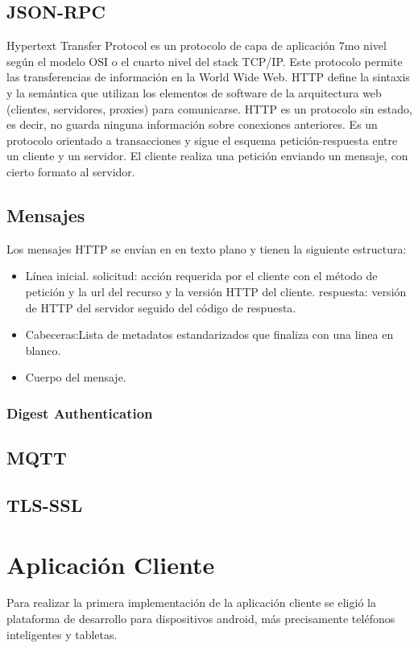 \subsection{JSON-RPC}
Hypertext Transfer Protocol es un protocolo de capa de aplicación 7mo nivel según el modelo OSI o el cuarto nivel del stack TCP/IP. Este protocolo permite las transferencias de información en la World Wide Web. HTTP define la sintaxis y la semántica que utilizan los elementos de software de la arquitectura web (clientes, servidores, proxies) para comunicarse. HTTP es un protocolo sin estado, es decir, no guarda ninguna información sobre conexiones anteriores.
Es un protocolo orientado a transacciones y sigue el esquema petición-respuesta entre un cliente y un servidor. El cliente realiza una petición enviando un mensaje, con cierto formato al servidor. 
\subsection{Mensajes}
Los mensajes HTTP se envían en en texto plano y tienen la siguiente estructura:

\begin{itemize}
	\item Línea inicial.
	\subitem solicitud: acción requerida por el cliente con el método de petición y la url del recurso y la versión HTTP del cliente.
	\subitem respuesta: versión de HTTP del servidor seguido del código de respuesta.
	\item Cabeceras:Lista de metadatos estandarizados que finaliza con una linea en blanco.
	\item Cuerpo del mensaje.
\end{itemize}

\subsubsection{Digest Authentication}

\subsection{MQTT}
\subsection{TLS-SSL}

\section{Aplicación Cliente}
Para realizar la primera implementación de la aplicación cliente se eligió la plataforma de desarrollo para dispositivos android, más precisamente teléfonos inteligentes y tabletas.

